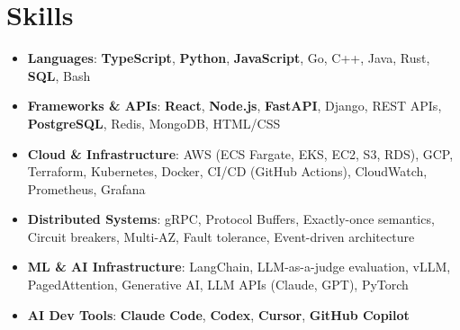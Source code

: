 \documentclass[letterpaper,11pt]{article}
\newcommand{\resumeSubHeadingListStart}{\begin{itemize}[leftmargin=0.15in, label={}]}
\newcommand{\resumeSubHeadingListEnd}{\end{itemize}}
\newcommand{\resumeSkillHeading}[2]{%
  \item\small{\textbf{#1}: #2 \vspace{-9pt}}%
}
\begin{document}
\section{Skills}
  \resumeSubHeadingListStart
    \resumeSkillHeading{Languages}{\textbf{TypeScript}, \textbf{Python}, \textbf{JavaScript}, Go, C++, Java, Rust, \textbf{SQL}, Bash}
    \resumeSkillHeading{Frameworks \& APIs}{\textbf{React}, \textbf{Node.js}, \textbf{FastAPI}, Django, REST APIs, \textbf{PostgreSQL}, Redis, MongoDB, HTML/CSS}
    \resumeSkillHeading{Cloud \& Infrastructure}{AWS (ECS Fargate, EKS, EC2, S3, RDS), GCP, Terraform, Kubernetes, Docker, CI/CD (GitHub Actions), CloudWatch, Prometheus, Grafana}
    \resumeSkillHeading{Distributed Systems}{gRPC, Protocol Buffers, Exactly-once semantics, Circuit breakers, Multi-AZ, Fault tolerance, Event-driven architecture}
    \resumeSkillHeading{ML \& AI Infrastructure}{LangChain, LLM-as-a-judge evaluation, vLLM, PagedAttention, Generative AI, LLM APIs (Claude, GPT), PyTorch}
    \resumeSkillHeading{AI Dev Tools}{\textbf{Claude Code}, \textbf{Codex}, \textbf{Cursor}, \textbf{GitHub Copilot}}
  \resumeSubHeadingListEnd
\end{document}

